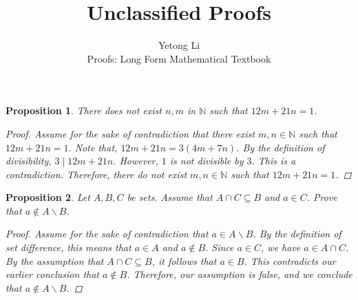 \documentclass[12pt]{article}
\newcommand{\N}{\mathbb{N}} %
\newtheorem{proposition}{Proposition}
\begin{document}

\title{Unclassified Proofs}
\author{Yetong Li \\ Proofs: Long Form Mathematical Textbook}

\maketitle


\begin{proposition}
  There does not exist $n, m$ in $\N$ such that $12m + 21n = 1$.
  \begin{proof}
    Assume for the sake of contradiction that there exist $m, n \in \N$ such that $12m + 21n = 1$.
    Note that, $12m + 21n = 3(4m + 7n)$.
    By the definition of divisibility, $3 \mid 12m + 21n$.
    However, $1$ is not divisible by $3$.
    This is a contradiction.
    Therefore, there do not exist $m, n \in \N$ such that $12m + 21n = 1$.
  \end{proof}
\end{proposition}


\begin{proposition}
  Let $A, B, C$ be sets. Assume that $A \cap C \subseteq B$ and $a \in C$.
  Prove that $a \notin A \backslash B$.
  \begin{proof}
    Assume for the sake of contradiction that $a \in A \backslash B$.
    By the definition of set difference, this means that $a \in A$ and $a \notin B$.
    Since $a \in C$, we have $a \in A \cap C$.
    By the assumption that $A \cap C \subseteq B$, it follows that $a \in B$.
    This contradicts our earlier conclusion that $a \notin B$.
    Therefore, our assumption is false, and we conclude that $a \notin A \backslash B$.
  \end{proof}
\end{proposition}
\end{document}

